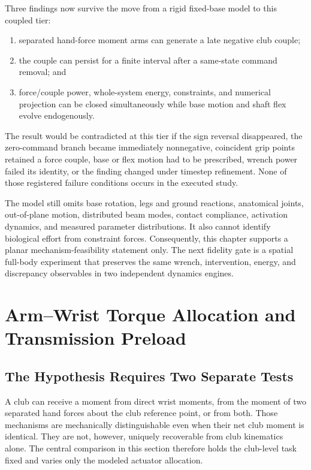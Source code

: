 \documentclass[
  letterpaper,
]{report}
\providecommand{\tightlist}{%
  \setlength{\itemsep}{0pt}\setlength{\parskip}{0pt}}
\begin{document}
Three findings now survive the move from a rigid fixed-base model to
this coupled tier:

\begin{enumerate}
\def\labelenumi{\arabic{enumi}.}
\tightlist
\item
  separated hand-force moment arms can generate a late negative club
  couple;
\item
  the couple can persist for a finite interval after a same-state
  command removal; and
\item
  force/couple power, whole-system energy, constraints, and numerical
  projection can be closed simultaneously while base motion and shaft
  flex evolve endogenously.
\end{enumerate}

The result would be contradicted at this tier if the sign reversal
disappeared, the zero-command branch became immediately nonnegative,
coincident grip points retained a force couple, base or flex motion had
to be prescribed, wrench power failed its identity, or the finding
changed under timestep refinement. None of those registered failure
conditions occurs in the executed study.

The model still omits base rotation, legs and ground reactions,
anatomical joints, out-of-plane motion, distributed beam modes, contact
compliance, activation dynamics, and measured parameter distributions.
It also cannot identify biological effort from constraint forces.
Consequently, this chapter supports a planar mechanism-feasibility
statement only. The next fidelity gate is a spatial full-body experiment
that preserves the same wrench, intervention, energy, and discrepancy
observables in two independent dynamics engines.

\chapter{Arm--Wrist Torque Allocation and Transmission
Preload}\label{sec-torque-allocation-preload}

\section{The Hypothesis Requires Two Separate
Tests}\label{the-hypothesis-requires-two-separate-tests}

A club can receive a moment from direct wrist moments, from the moment
of two separated hand forces about the club reference point, or from
both. Those mechanisms are mechanically distinguishable even when their
net club moment is identical. They are not, however, uniquely
recoverable from club kinematics alone. The central comparison in this
section therefore holds the club-level task fixed and varies only the
modeled actuator allocation.
\end{document}
